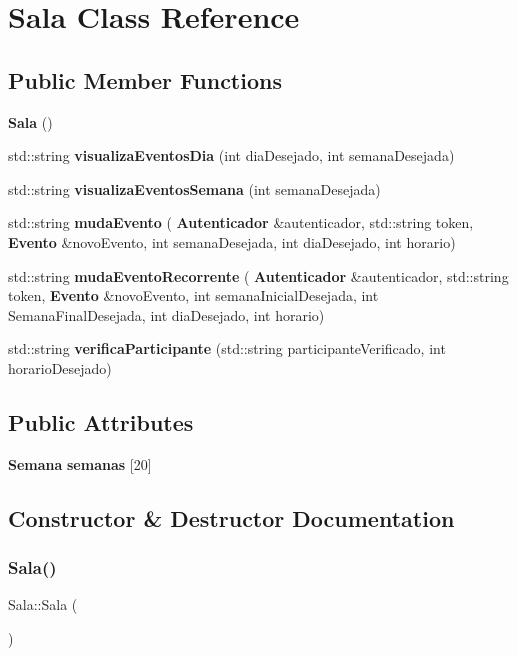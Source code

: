 \section{Sala Class Reference}
\label{class_sala}
\subsection*{Public Member Functions}
\begin{DoxyCompactItemize}
\item 
\textbf{ Sala} ()
\item 
std\+::string \textbf{ visualiza\+Eventos\+Dia} (int dia\+Desejado, int semana\+Desejada)
\item 
std\+::string \textbf{ visualiza\+Eventos\+Semana} (int semana\+Desejada)
\item 
std\+::string \textbf{ muda\+Evento} (\textbf{ Autenticador} \&autenticador, std\+::string token, \textbf{ Evento} \&novo\+Evento, int semana\+Desejada, int dia\+Desejado, int horario)
\item 
std\+::string \textbf{ muda\+Evento\+Recorrente} (\textbf{ Autenticador} \&autenticador, std\+::string token, \textbf{ Evento} \&novo\+Evento, int semana\+Inicial\+Desejada, int Semana\+Final\+Desejada, int dia\+Desejado, int horario)
\item 
std\+::string \textbf{ verifica\+Participante} (std\+::string participante\+Verificado, int horario\+Desejado)
\end{DoxyCompactItemize}
\subsection*{Public Attributes}
\begin{DoxyCompactItemize}
\item 
\textbf{ Semana} \textbf{ semanas} [20]
\end{DoxyCompactItemize}


\subsection{Constructor \& Destructor Documentation}
\mbox{\label{class_sala_afcf1b7b533e776b043ce8fb13c6268ca}} 
\subsubsection{Sala()}
{\footnotesize\ttfamily Sala\+::\+Sala (\begin{DoxyParamCaption}{ }\end{DoxyParamCaption})\hspace{0.3cm}{\ttfamily [inline]}}



